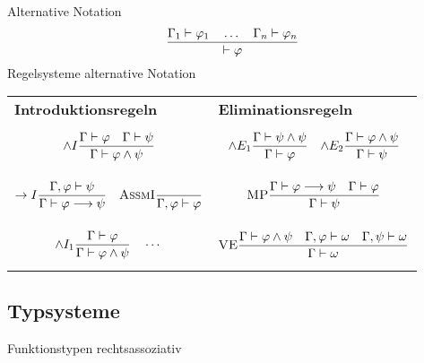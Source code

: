 \documentclass{Zusammenfassung}
\newcommand{\typeRule}[3]{ \textrm{\textsc{#1}}\frac{#2}{#3}}
\newcommand{\E}{\;}
\newcommand{\liin}[2]{#1\E{}#2}
\newcommand{\lii}[2]{(#1\E{}#2)}
\newcommand{\abs}[2]{\lambda{}#1.#2}
\begin{document}
Alternative Notation
\begin{equation*}
    \typeRule{}{
    \Gamma_1 \vdash \varphi_1\quad\dots\quad\Gamma_n\vdash\varphi_n
    }{
    \vdash \varphi
    }
\end{equation*}
Regelsysteme alternative Notation
\begin{table}[H]
    \centering
    \begin{tabularx}{\textwidth}{XX}
        \centerline{\textbf{Introduktionsregeln}} &\centerline{\textbf{Eliminationsregeln}}\\
        \begin{equation*}\typeRule{$\wedge{}I$}{\Gamma\vdash\varphi\quad\Gamma\vdash\psi}{\Gamma\vdash\varphi\wedge\psi}\end{equation*}&\begin{equation*}\typeRule{$\wedge{}E_1$}{\Gamma\vdash\psi\wedge\psi}{\Gamma\vdash\varphi}\quad\typeRule{$\wedge{}E_2$}{\Gamma\vdash\varphi\wedge\psi}{\Gamma\vdash\psi}\end{equation*}\\
        \begin{equation*}\typeRule{$\rightarrow{}I$}{\Gamma,\varphi\vdash\psi}{\Gamma\vdash\varphi\longrightarrow\psi}\quad\typeRule{AssmI}{}{\Gamma,\varphi\vdash\varphi}\end{equation*}&\begin{equation*}\typeRule{MP}{\Gamma\vdash\varphi\longrightarrow\psi\quad\Gamma\vdash\varphi}{\Gamma\vdash\psi}\end{equation*}\\
        \begin{equation*}\typeRule{$\wedge{}I_1$}{\Gamma\vdash\varphi}{\Gamma\vdash\varphi\wedge\psi}\quad\cdots\end{equation*}&\begin{equation*}\typeRule{VE}{\Gamma\vdash\varphi\wedge\psi\quad\Gamma,\varphi\vdash\omega\quad\Gamma,\psi\vdash\omega}{\Gamma\vdash\omega}\end{equation*}\\
    \end{tabularx}\label{tab:table5}
\end{table}
\subsection{Typsysteme}
Funktionstypen rechtsassoziativ
%
%
\end{document}
